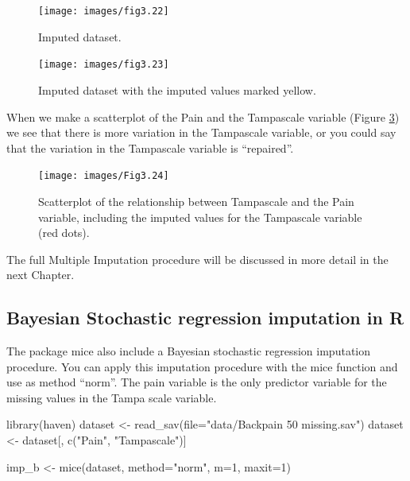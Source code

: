 \documentclass[
]{book}
\newenvironment{Shaded}{\begin{snugshade}}{\end{snugshade}}
\newcommand{\AttributeTok}[1]{\textcolor[rgb]{0.77,0.63,0.00}{#1}}
\newcommand{\DecValTok}[1]{\textcolor[rgb]{0.00,0.00,0.81}{#1}}
\newcommand{\FunctionTok}[1]{\textcolor[rgb]{0.00,0.00,0.00}{#1}}
\newcommand{\NormalTok}[1]{#1}
\newcommand{\OtherTok}[1]{\textcolor[rgb]{0.56,0.35,0.01}{#1}}
\newcommand{\StringTok}[1]{\textcolor[rgb]{0.31,0.60,0.02}{#1}}
\begin{document}
\begin{figure}

{\centering \texttt{[image: images/fig3.22]} 

}

\caption{Imputed dataset.}\label{fig:fig3-22}
\end{figure}

\begin{figure}

{\centering \texttt{[image: images/fig3.23]} 

}

\caption{Imputed dataset with the imputed values marked yellow.}\label{fig:fig3-23}
\end{figure}

When we make a scatterplot of the Pain and the Tampascale variable (Figure \ref{fig:fig3-24}) we see that there is more variation in the Tampascale variable, or you could say that the variation in the Tampascale variable is ``repaired''.

\begin{figure}

{\centering \texttt{[image: images/Fig3.24]} 

}

\caption{Scatterplot of the relationship between Tampascale and the Pain variable, including the imputed values for the Tampascale variable (red dots).}\label{fig:fig3-24}
\end{figure}

The full Multiple Imputation procedure will be discussed in more detail in the next Chapter.

\hypertarget{bayesian-stochastic-regression-imputation-in-r}{%
\subsection{Bayesian Stochastic regression imputation in R}\label{bayesian-stochastic-regression-imputation-in-r}}

The package mice also include a Bayesian stochastic regression imputation procedure. You can apply this imputation procedure with the mice function and use as method ``norm''. The pain variable is the only predictor variable for the missing values in the Tampa scale variable.

\begin{Shaded}
\begin{Highlighting}[]
\FunctionTok{library}\NormalTok{(haven)}
\NormalTok{dataset }\OtherTok{\textless{}{-}} \FunctionTok{read\_sav}\NormalTok{(}\AttributeTok{file=}\StringTok{"data/Backpain 50 missing.sav"}\NormalTok{)}
\NormalTok{dataset }\OtherTok{\textless{}{-}}\NormalTok{ dataset[, }\FunctionTok{c}\NormalTok{(}\StringTok{"Pain"}\NormalTok{, }\StringTok{"Tampascale"}\NormalTok{)]}

\NormalTok{imp\_b }\OtherTok{\textless{}{-}} \FunctionTok{mice}\NormalTok{(dataset, }\AttributeTok{method=}\StringTok{"norm"}\NormalTok{, }\AttributeTok{m=}\DecValTok{1}\NormalTok{, }\AttributeTok{maxit=}\DecValTok{1}\NormalTok{)}
\end{Highlighting}
\end{Shaded}
\end{document}
